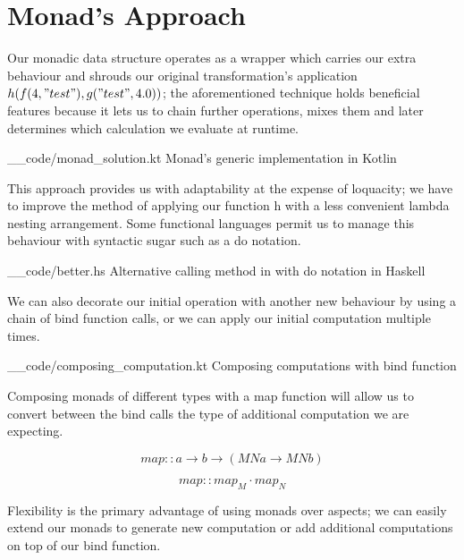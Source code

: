 
\section{Monad's Approach}
\label{sec::solution}

Our monadic data structure operates as a wrapper which carries our extra behaviour and shrouds our original transformation's application $h(f(4, "test"), g("test", 4.0))$; the aforementioned technique holds beneficial features because it lets us to chain further operations, mixes them and later determines which calculation we evaluate at runtime. 

    {__code/monad_solution.kt}
    {Monad's generic implementation in Kotlin}
\label{fig::solution::monad::example}

This approach provides us with adaptability at the expense of loquacity; we have to improve the method of applying our function h with a less convenient lambda nesting arrangement. Some functional languages permit us to manage this behaviour with syntactic sugar such as a do notation.

    {__code/better.hs}
    {Alternative calling method in with do notation in Haskell}
\label{fig::better::haskell}
 
We can also decorate our initial operation with another new behaviour by using a chain of bind function calls, or we can apply our initial computation multiple times. 

    {__code/composing_computation.kt}
    {Composing computations with bind function}
\label{fig::composition::monad}

Composing monads of different types with a map function will allow us to convert between the bind calls the type of additional computation we are expecting.

\begin{equation}
    map :: a \rightarrow b \rightarrow (M N a \rightarrow M N b)
\end{equation}

\begin{equation}
    map :: map_M \cdot map_N
\end{equation}

Flexibility is the primary advantage of using monads over aspects; we can easily extend our monads to generate new computation or add additional computations on top of our bind function.